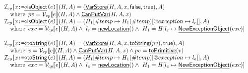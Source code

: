 \documentclass{article}
\makeatletter
\newcommand{\SF}[1]{\mbox{\textsf{#1}}}
\newcommand{\TT}[1]{\mbox{\texttt{#1}}}
\newcommand{\wherec}[1]{{\rm where}\begin{array}[t]{l}#1\end{array}}
\newcommand{\I}{\mathcal{I}}
\newcommand{\V}{\mathcal{V}}
\newcommand{\lbr}{\llbracket}
\newcommand{\rbr}{\rrbracket}
\newcommand{\hfi}[1]{\hf{\ensuremath{\diamond}#1}}
\newcommand{\hf}[1]{\underline{\sf #1}}
\newcommand{\varloc}[1]{\##1}
\newcommand{\varprop}[1]{@#1}
\newcommand{\vtrue}{\SF{true}}
\newcommand{\vfalse}{\SF{false}}
\makeatother
\begin{document}
\[\begin{array}{ll}
\I _{cp}\lbr x \TT{:=} \hfi{isObject}\TT{(}e\TT{)} \rbr(H,A)
 = (\hf{VarStore}(H,A,x,\vfalse,\SF{true}),A)\\
 \quad\wherec{pv = \V _{cp}\lbr e\rbr(H,A)\land \hf{CanPutVar}(H,A,x)}\\
\I _{cp}\lbr x \TT{:=} \hfi{isObject}\TT{(}e\TT{)} \rbr(H,A)
 = (H_1[\varloc{temp}\mapsto H_1(\varloc{temp})[\varprop{exception}\mapsto l_{e}]], A) \\
\quad\wherec{
  exc = \V_{cp}\lbr e\rbr(H,A) 
  \land\ l_e = \hf{newLocation}()
  \land\ H_1=H[l_e\mapsto\hf{NewExceptionObject}(exc)] \\
}
\\\\
\I _{cp}\lbr x \TT{:=} \hfi{toString}\TT{(}e\TT{)} \rbr(H,A)
= (\hf{VarStore}(H,A,x,\hf{toString}(pv),\vtrue), A)
\\\quad\wherec{v = \V _{cp}\lbr e\rbr(H,A)\land \hf{CanPutVar}(H,A,x)\land pv=\hf{toPrimitive}(v)}\\
\I _{cp}\lbr x \TT{:=} \hfi{toString}\TT{(}e\TT{)} \rbr(H,A)
 = (H_1[\varloc{temp}\mapsto H_1(\varloc{temp})[\varprop{exception}\mapsto l_{e}]], A) \\
\quad\wherec{
  exc = \V_{cp}\lbr e\rbr(H,A) 
  \land\ l_e = \hf{newLocation}()
  \land\ H_1=H[l_e\mapsto\hf{NewExceptionObject}(exc)] \\
}
\\\\
\end{array}
\]
\end{document}
